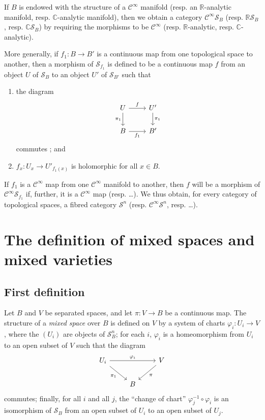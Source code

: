 \documentclass{article}
\theoremstyle{plain}
\theoremstyle{definition}
\newcommand{\RR}{\mathbb{R}}
\newcommand{\CC}{\mathbb{C}}
\newcommand{\oldpage}[1]{\marginpar{\footnotesize$\Big\vert$ \textit{p.~#1}}}
\begin{document}
If $B$ is endowed with the structure of a $\mathscr{C}^\infty$ manifold (resp. an $\RR$-analytic manifold, resp. $\CC$-analytic manifold), then we obtain a category $\mathscr{C}^\infty\mathscr{S}_B$ (resp. $\RR\mathscr{S}_B$, resp. $\CC\mathscr{S}_B$) by requiring the morphisms to be $\mathscr{C}^\infty$ (resp. $\RR$-analytic, resp. $\CC$-analytic).

More generally, if $f_1\colon B\to B'$ is a continuous map from one topological space to another, then a morphism of $\mathscr{S}_{f_1}$ is defined to be a continuous map $f$ from an object $U$ of $\mathscr{S}_B$ to an object $U'$ of $\mathscr{S}_{B'}$ such that
\begin{enumerate}
  \item the diagram
    \[
      \begin{tikzcd}
        U \rar["f"] \dar[swap,"\pi_1"]
        & U' \dar["\pi_1"]
      \\B \rar[swap,"f_1"]
        & B'
      \end{tikzcd}
    \]
    commutes ; and
  \item $f_x\colon U_x\to U'_{f_1(x)}$ is holomorphic for all $x\in B$.
\end{enumerate}

\oldpage{2-02}
If $f_1$ is a $\mathscr{C}^\infty$ map from one $\mathscr{C}^\infty$ manifold to another, then $f$ will be a morphism of $\mathscr{C}^\infty\mathscr{S}_{f_1}$ if, further, it is a $\mathscr{C}^\infty$ map (resp. \ldots).
We thus obtain, for every category of topological spaces, a fibred category $\mathscr{S}^n$ (resp. $\mathscr{C}^\infty\mathscr{S}^n$, resp. \ldots).


\section{The definition of mixed spaces and mixed varieties}
\label{II}

\subsection{First definition}
\label{II.1}

Let $B$ and $V$ be separated spaces, and let $\pi\colon V\to B$ be a continuous map.
The structure of a \emph{mixed space} over $B$ is defined on $V$ by a system of charts $\varphi_i\colon U_i\to V$, where the $(U_i)$ are objects of $\mathscr{S}_B^n$;
for each $i$, $\varphi_i$ is a homeomorphism from $U_i$ to an open subset of $V$ such that the diagram
\[
  \begin{tikzcd}
    U_i \ar[rr,"\varphi_i"] \ar[dr,swap,"\pi_1"]
    && V \ar[dl,"\pi"]
  \\&B&
  \end{tikzcd}
\]
commutes;
finally, for all $i$ and all $j$, the ``change of chart'' $\varphi_j^{-1}\circ\varphi_i$ is an isomorphism of $\mathscr{S}_B$ from an open subset of $U_i$ to an open subset of $U_j$.
\end{document}

